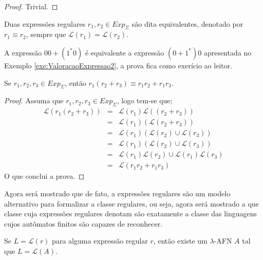 \begin{proof}
  Trivial.
\end{proof}

\begin{definicao}
  Duas expressões regulares $r_1, r_2 \in Exp_\Sigma$ são dita equivalentes, denotado por $r_1 \equiv r_2$, sempre que $\mathcal{L}(r_1) = \mathcal{L}(r_2)$.
\end{definicao}

\begin{exemplo}
  A expressão $00 + (1^*0)$ é equivalente a expressão $(0 + 1^*)0$ apresentada no Exemplo \ref{exe:ValoracaoExpressao2}, a prova fica como exerício ao leitor. 
\end{exemplo}

\begin{teorema}
  Se $r_1, r_2, r_3 \in Exp_\Sigma$, então $r_1 (r_2 + r_3) \equiv r_1r_2 + r_1r_3$.
\end{teorema}

\begin{proof}
	Assuma que $r_1, r_2, r_3 \in Exp_\Sigma$, logo tem-se que;
	\begin{eqnarray*}
		\mathcal{L}(r_1 (r_2 + r_3)) & = & \mathcal{L}(r_1)\mathcal{L}((r_2 + r_3))\\
		& = & \mathcal{L}(r_1)(\mathcal{L}(r_2 + r_3))\\
		& = & \mathcal{L}(r_1)(\mathcal{L}(r_2) \cup  \mathcal{L}(r_3))\\ 
		& = & \mathcal{L}(r_1)(\mathcal{L}(r_2) \cup  \mathcal{L}(r_3))\\ 
		& = & \mathcal{L}(r_1)\mathcal{L}(r_2) \cup  \mathcal{L}(r_1)\mathcal{L}(r_3)\\ 
		& = & \mathcal{L}(r_1r_2 + r_1r_3)
	\end{eqnarray*}
	O que conclui a prova.
\end{proof}

Agora será mostrado que de fato, a expressões regulares são um modelo alternativo para formalizar a classe regulares, ou seja, agora será mostrado a que classe cuja expressões regulares denotam são exatamente a classe das linguagens cujos autômatos finitos são capazes de reconhecer.

\begin{teorema}\label{teo:Exp-AFN}
	Se $L = \mathcal{L}(r)$ para alguma expressão regular $r$, então existe um $\lambda$-AFN $A$ tal que $L = \mathcal{L}(A)$.
\end{teorema}

